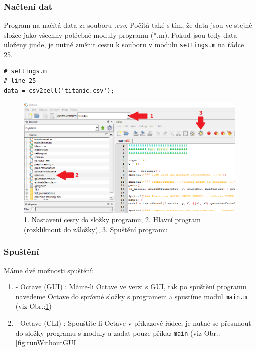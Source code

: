 \documentclass[a4]{article}
\begin{document}
\subsubsection{Načtení dat}
Program na načítá data ze souboru \textit{.csv}. Počítá také s tím, že data jsou ve stejné složce jako všechny potřebné moduly programu (*.m). Pokud jsou tedy data uloženy jinde, je nutné změnit cestu k souboru v modulu \texttt{settings.m} na řádce 25.

\begin{lstlisting}
# settings.m
# line 25
data = csv2cell('titanic.csv');
\end{lstlisting}

\begin{figure}[!ht]
	\centering
		\includegraphics[width=\textwidth]{images/runWithGUI}
	\caption{1. Nastavení cesty do složky programu, 2. Hlavní program (rozkliknout do záložky), 3. Spuštění programu}
	\label{fig:runWithGUI}
\end{figure}

\subsubsection{Spuštění}
Máme dvě možnosti spuštění:

\begin{enumerate}
	\item - Octave (GUI) : Máme-li Octave ve verzi s GUI, tak po spuštění programu navedeme Octave do správné složky s programem a spustíme modul \texttt{main.m} (viz Obr.:\ref{fig:runWithGUI})
	\item - Octave (CLI) : Spouštíte-li Octave v příkazové řádce, je nutné se přesunout do složky programu s moduly a zadat pouze příkaz \texttt{main} (viz Obr.:\ref{fig:runWithoutGUI}.
\end{enumerate}
\end{document}
